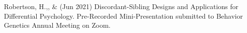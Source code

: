 
\item Robertson, H.,\noteA \Joe, \&  \meb (Jun 2021) Discordant-Sibling Designs and Applications for Differential Psychology. Pre-Recorded Mini-Presentation submitted to Behavior Genetics Annual Meeting on Zoom.


